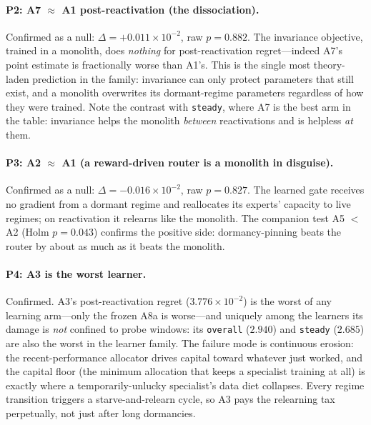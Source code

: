 \documentclass[11pt,a4paper]{article}
\theoremstyle{definition}
\theoremstyle{plain}
\begin{document}
\paragraph{P2: A7 $\approx$ A1 post-reactivation (the dissociation).}
Confirmed as a null: $\Delta = +0.011 \times 10^{-2}$, raw $p = 0.882$. The
invariance objective, trained in a monolith, does \emph{nothing} for
post-reactivation regret---indeed A7's point estimate is fractionally worse
than A1's. This is the single most theory-laden prediction in the family:
invariance can only protect parameters that still exist, and a monolith
overwrites its dormant-regime parameters regardless of how they were
trained. Note the contrast with \texttt{steady}, where A7 is the best arm in
the table: invariance helps the monolith \emph{between} reactivations and is
helpless \emph{at} them.

\paragraph{P3: A2 $\approx$ A1 (a reward-driven router is a monolith in
disguise).}
Confirmed as a null: $\Delta = -0.016 \times 10^{-2}$, raw $p = 0.827$. The
learned gate receives no gradient from a dormant regime and reallocates its
experts' capacity to live regimes; on reactivation it relearns like the
monolith. The companion test A5 $<$ A2 (Holm $p = 0.043$) confirms the
positive side: dormancy-pinning beats the router by about as much as it
beats the monolith.

\paragraph{P4: A3 is the worst learner.}
Confirmed. A3's post-reactivation regret ($3.776 \times 10^{-2}$) is the
worst of any learning arm---only the frozen A8a is worse---and uniquely
among the learners its damage is \emph{not} confined to probe windows: its
\texttt{overall} ($2.940$) and \texttt{steady} ($2.685$) are also the worst
in the learner family. The failure mode is continuous erosion: the
recent-performance allocator drives capital toward whatever just worked,
and the capital floor (the minimum allocation that keeps a specialist
training at all) is exactly where a temporarily-unlucky specialist's data
diet collapses. Every regime transition triggers a starve-and-relearn cycle,
so A3 pays the relearning tax perpetually, not just after long dormancies.
\end{document}
